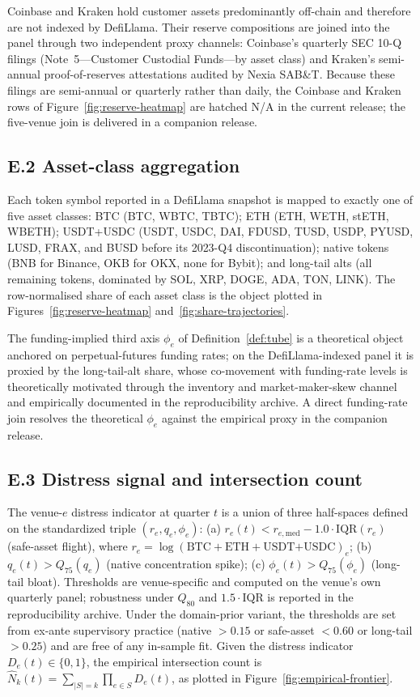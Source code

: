 Coinbase and Kraken hold customer assets predominantly off-chain
and therefore are not indexed by DefiLlama. Their reserve
compositions are joined into the panel through two independent
proxy channels: Coinbase's quarterly SEC 10-Q filings
(Note~5---Customer Custodial Funds---by asset class) and Kraken's
semi-annual proof-of-reserves attestations audited by Nexia
SAB\&T. Because these filings are semi-annual or quarterly rather
than daily, the Coinbase and Kraken rows of
Figure~\ref{fig:reserve-heatmap} are hatched N/A in the current
release; the five-venue join is delivered in a companion release.

\subsection*{E.2 Asset-class aggregation}

Each token symbol reported in a DefiLlama snapshot is mapped to
exactly one of five asset classes:
BTC (BTC, WBTC, TBTC);
ETH (ETH, WETH, stETH, WBETH);
USDT+USDC (USDT, USDC, DAI, FDUSD, TUSD, USDP, PYUSD, LUSD, FRAX,
and BUSD before its 2023-Q4 discontinuation);
native tokens (BNB for Binance, OKB for OKX, none for Bybit); and
long-tail alts (all remaining tokens, dominated by SOL, XRP, DOGE,
ADA, TON, LINK). The row-normalised share of each asset class is
the object plotted in Figures~\ref{fig:reserve-heatmap}
and~\ref{fig:share-trajectories}.

The funding-implied third axis $\phi_e$ of
Definition~\ref{def:tube} is a theoretical object anchored on
perpetual-futures funding rates; on the DefiLlama-indexed panel it
is proxied by the long-tail-alt share, whose co-movement with
funding-rate levels is theoretically motivated through the
inventory and market-maker-skew channel and empirically documented
in the reproducibility archive. A direct funding-rate join
resolves the theoretical $\phi_e$ against the empirical proxy in
the companion release.

\subsection*{E.3 Distress signal and intersection count}

The venue-$e$ distress indicator at quarter $t$ is a union of
three half-spaces defined on the standardized triple
$(r_e, q_e, \phi_e)$:
(a) $r_e(t) < r_{e,\mathrm{med}} - 1.0 \cdot \mathrm{IQR}(r_e)$
(safe-asset flight), where
$r_e = \log(\text{BTC} + \text{ETH} + \text{USDT+USDC})_e$;
(b) $q_e(t) > Q_{75}(q_e)$ (native concentration spike);
(c) $\phi_e(t) > Q_{75}(\phi_e)$ (long-tail bloat). Thresholds are
venue-specific and computed on the venue's own quarterly panel;
robustness under $Q_{80}$ and $1.5\cdot$IQR is reported in the
reproducibility archive. Under the domain-prior variant, the
thresholds are set from ex-ante supervisory practice
(native $> 0.15$ or safe-asset $< 0.60$ or long-tail $> 0.25$) and
are free of any in-sample fit. Given the distress indicator
$D_e(t) \in \{0, 1\}$, the empirical intersection count is
$\hat N_k(t) = \sum_{|S|=k} \prod_{e \in S} D_e(t)$,
as plotted in Figure~\ref{fig:empirical-frontier}.

